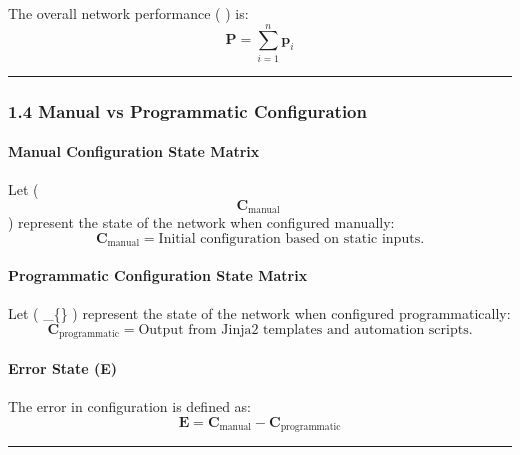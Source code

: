 \documentclass[11pt]{article}
\begin{document}
The overall network performance (  ) is: \[
\mathbf{P} = \sum_{i=1}^{n} \mathbf{p}_i
\]

\begin{center}\rule{0.5\linewidth}{0.5pt}\end{center}

\hypertarget{manual-vs-programmatic-configuration}{%
\subsubsection{\texorpdfstring{\textbf{1.4 Manual vs Programmatic
Configuration}}{1.4 Manual vs Programmatic Configuration}}\label{manual-vs-programmatic-configuration}}

\hypertarget{manual-configuration-state-matrix}{%
\paragraph{\texorpdfstring{\textbf{Manual Configuration State
Matrix}}{Manual Configuration State Matrix}}\label{manual-configuration-state-matrix}}

Let (\[ \mathbf{C}_{\text{manual}} \ \]) represent the state of the
network when configured manually: \[
\mathbf{C}_{\text{manual}} = \text{Initial configuration based on static inputs}.
\]

\hypertarget{programmatic-configuration-state-matrix}{%
\paragraph{\texorpdfstring{\textbf{Programmatic Configuration State
Matrix}}{Programmatic Configuration State Matrix}}\label{programmatic-configuration-state-matrix}}

Let ( \_\{\} ) represent the state of the
network when configured programmatically: \[
\mathbf{C}_{\text{programmatic}} = \text{Output from Jinja2 templates and automation scripts}.
\]

\hypertarget{error-state-e}{%
\paragraph{\texorpdfstring{\textbf{Error State
(E)}}{Error State (E)}}\label{error-state-e}}

The error in configuration is defined as: \[
\mathbf{E} = \mathbf{C}_{\text{manual}} - \mathbf{C}_{\text{programmatic}}
\]

\begin{center}\rule{0.5\linewidth}{0.5pt}\end{center}
\end{document}
